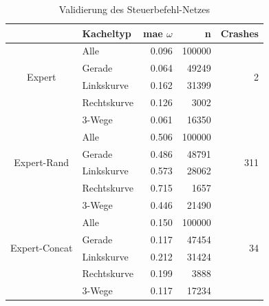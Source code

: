\begin{table}[H]
	\centering
	\begin{tabular}[t]{|c|l|r|r|r|}
		\hline
		& \textbf{Kacheltyp} & \textbf{\acs{mae} $\omega$} & \textbf{n} & \textbf{Crashes} \\
		\hline
		\multirow{4}{*}{Expert} 
		& Alle
		& 0.096
		& 100000
		& \multirow{4}{*}{2}\\
		\cline{2-4}
		& Gerade
		&  0.064
		& 49249
		&\\
		\cline{2-4}
		& Linkskurve
		& 0.162
		& 31399
		&\\
		\cline{2-4}
		& Rechtskurve
		& 0.126
		& 3002
		&\\
		\cline{2-4}
		& 3-Wege
		&  0.061
		& 16350
		&\\
		\hline
		\multirow{4}{*}{Expert-Rand} 
		& Alle
		& 0.506
		& 100000
		& \multirow{4}{*}{311}\\
		\cline{2-4}
		& Gerade
		&  0.486
		& 48791
		& \\
		\cline{2-4}
		& Linkskurve
		& 0.573
		& 28062
		&\\
		\cline{2-4}
		& Rechtskurve
		& 0.715
		& 1657
		&\\
		\cline{2-4}
		& 3-Wege
		& 0.446
		& 21490
		&\\
		\hline
		\multirow{4}{*}{Expert-Concat} 
		& Alle
		& 0.150
		& 100000
		& \multirow{4}{*}{34}\\
		\cline{2-4}
		& Gerade
		& 0.117
		& 47454
		&\\
		\cline{2-4}
		& Linkskurve
		& 0.212
		& 31424
		&\\
		\cline{2-4}
		& Rechtskurve
		& 0.199
		& 3888
		&\\
		\cline{2-4}
		& 3-Wege
		& 0.117
		& 17234
		&\\
		\hline
	\end{tabular}
	\caption{Validierung des Steuerbefehl-Netzes}
	\label{expert-validation}
\end{table}


